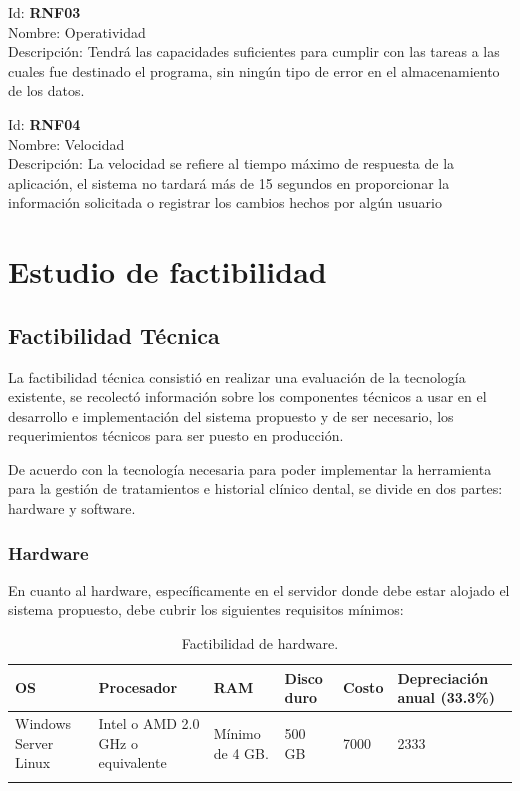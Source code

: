 \vspace{1em}

\noindent Id:  \textbf{RNF03}\\
Nombre: Operatividad\\
Descripción: Tendrá las capacidades suficientes para cumplir con las tareas a las cuales fue destinado el programa, sin ningún tipo de error en el almacenamiento de los datos.

\vspace{1em}

\noindent Id:  \textbf{RNF04}\\
Nombre: Velocidad\\
Descripción: La velocidad se refiere al tiempo máximo de respuesta de la aplicación, el sistema no tardará más de 15 segundos en proporcionar la información solicitada o registrar los cambios hechos por algún usuario


\newpage
\section{Estudio de factibilidad}

\subsection{Factibilidad Técnica}

\noindent
La factibilidad técnica consistió en realizar una evaluación de la tecnología existente, se recolectó información sobre los componentes técnicos a usar en el desarrollo e implementación del sistema propuesto y de ser necesario, los requerimientos técnicos para ser puesto en producción.

\vspace{1em}

\noindent
De acuerdo con la tecnología necesaria para poder implementar la herramienta para la gestión de tratamientos e historial clínico dental, se divide en dos partes: hardware y software.

\subsubsection{Hardware}
\noindent
En cuanto al hardware, específicamente en el servidor donde debe estar alojado el sistema propuesto, debe cubrir los siguientes requisitos mínimos:

\begin{longtable}[c]{|p{3cm}|p{4cm}|p{2cm}|p{1.5cm}|p{1.5cm}|p{3cm}|}
\hline\textbf{OS} & \textbf{Procesador} & \textbf{RAM} & \textbf{Disco duro} & \textbf{Costo} & \textbf{Depreciación anual \cite{A13} (33.3\%)} \\ \hline
Windows Server \newline Linux
& Intel o AMD 2.0 GHz o equivalente
& Mínimo de 4 GB.
& 500 GB
& 7000
& 2333 \\ \hline
\caption{Factibilidad de hardware.}
\label{table:1}
\end{longtable}

